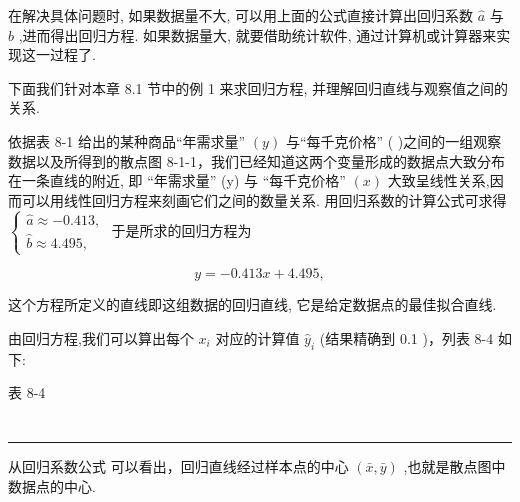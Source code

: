 \documentclass[10pt]{article}
\newcommand{\HRule}{\begin{center}\rule{0.9\linewidth}{0.2mm}\end{center}}
\newcommand*\circled[1]{\tikz[baseline=(char.base)]{\node[shape=circle,draw,inner sep=1.5pt] (char) {\small #1};}}
\begin{document}
在解决具体问题时, 如果数据量不大, 可以用上面的公式直接计算出回归系数 \(\widehat{a}\) 与 \(\widehat{b}\) ,进而得出回归方程. 如果数据量大, 就要借助统计软件, 通过计算机或计算器来实现这一过程了.

下面我们针对本章 8.1 节中的例 1 来求回归方程, 并理解回归直线与观察值之间的关系.

依据表 8-1 给出的某种商品“年需求量” \(\left( y\right)\) 与“每千克价格” (  )之间的一组观察数据以及所得到的散点图 8-1-1，我们已经知道这两个变量形成的数据点大致分布在一条直线的附近, 即 “年需求量” (y) 与 “每千克价格” \(\left( x\right)\) 大致呈线性关系,因而可以用线性回归方程来刻画它们之间的数量关系. 用回归系数的计算公式可求得 \(\left\{  \begin{array}{l} \widehat{a} \approx   - {0.413}, \\  \widehat{b} \approx  {4.495}, \end{array}\right.\) 于是所求的回归方程为

\[
y =  - {0.413x} + {4.495},
\]

这个方程所定义的直线即这组数据的回归直线, 它是给定数据点的最佳拟合直线.

由回归方程,我们可以算出每个 \({x}_{i}\) 对应的计算值 \({\widehat{y}}_{i}\) (结果精确到 0.1 )，列表 8-4 如下:

表 8-4

\begin{center}
\end{center}

\section*{}

\HRule

从回归系数公式  \circled{3} 可以看出，回归直线经过样本点的中心 \(\left( {\bar{x},\bar{y}}\right)\) ,也就是散点图中数据点的中心.
\end{document}
